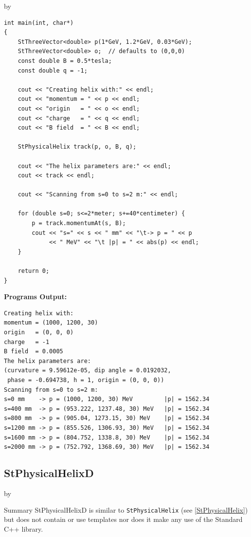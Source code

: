 \documentclass[twoside]{article}
\newcommand{\entrylabel}[1]{\mbox{\textbf{{#1}}}\hfil}%
\newenvironment{entry}
{\begin{list}{}%
    {\renewcommand{\makelabel}{\entrylabel}%
     \setlength{\labelwidth}{90pt}%
     \setlength{\leftmargin}{\labelwidth}
     \advance\leftmargin by \labelsep%
      }%
    }%
  {\end{list}}
\newcommand{\Entrylabel}[1]%
{\raisebox{0pt}[1ex][0pt]{\makebox[\labelwidth][l]%
    {\parbox[t]{\labelwidth}{\hspace{0pt}\textbf{{#1}}}}}}
\newenvironment{Entry}%
{\renewcommand{\entrylabel}{\Entrylabel}\begin{entry}}%
  {\end{entry}}
\begin{document}
\begin{description}
\begin{Entry}
{\begin{verbatim}
int main(int, char*)
{
    StThreeVector<double> p(1*GeV, 1.2*GeV, 0.03*GeV);
    StThreeVector<double> o;  // defaults to (0,0,0)
    const double B = 0.5*tesla;
    const double q = -1;

    cout << "Creating helix with:" << endl;
    cout << "momentum = " << p << endl;
    cout << "origin   = " << o << endl;
    cout << "charge   = " << q << endl;
    cout << "B field  = " << B << endl;

    StPhysicalHelix track(p, o, B, q);

    cout << "The helix parameters are:" << endl;
    cout << track << endl;
    
    cout << "Scanning from s=0 to s=2 m:" << endl;

    for (double s=0; s<=2*meter; s+=40*centimeter) {
        p = track.momentumAt(s, B);
        cout << "s=" << s << " mm" << "\t-> p = " << p
             << " MeV" << "\t |p| = " << abs(p) << endl; 
    }
    
    return 0;
}
\end{verbatim}
}%
{\bf Programs Output:}
{\footnotesize
\begin{verbatim}
Creating helix with:
momentum = (1000, 1200, 30)
origin   = (0, 0, 0)
charge   = -1
B field  = 0.0005
The helix parameters are:
(curvature = 9.59612e-05, dip angle = 0.0192032,
 phase = -0.694738, h = 1, origin = (0, 0, 0))
Scanning from s=0 to s=2 m:
s=0 mm    -> p = (1000, 1200, 30) MeV         |p| = 1562.34
s=400 mm  -> p = (953.222, 1237.48, 30) MeV   |p| = 1562.34
s=800 mm  -> p = (905.04, 1273.15, 30) MeV    |p| = 1562.34
s=1200 mm -> p = (855.526, 1306.93, 30) MeV   |p| = 1562.34
s=1600 mm -> p = (804.752, 1338.8, 30) MeV    |p| = 1562.34
s=2000 mm -> p = (752.792, 1368.69, 30) MeV   |p| = 1562.34
\end{verbatim}
} %
\end{Entry}

\clearpage

%
%
\subsection{StPhysicalHelixD } \label{StPhysicalHelixD}
\begin{Entry}
\item[Summary]
    StPhysicalHelixD is similar to \texttt{StPhysicalHelix}
    (see \ref{StPhysicalHelix}) but does not contain or use templates nor
    does it make any use of the Standard C++ library. 
    

\end{Entry}
\end{description}
\end{document}

